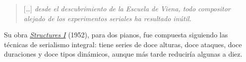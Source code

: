     \begin{quote}[\ldots] \emph{desde el descubrimiento de la Escuela de Viena, todo compositor alejado de los experimentos seriales ha resultado inútil.}\end{quote}

	Su obra \href{https://www.youtube.com/watch?v=QUF3XPTIlJo}{\emph{Structures I}} (1952), para dos pianos, fue compuesta siguiendo las técnicas de serialismo integral: tiene series de doce alturas, doce ataques, doce duraciones y doce tipos dinámicos, aunque más tarde reduciría algunas a diez.